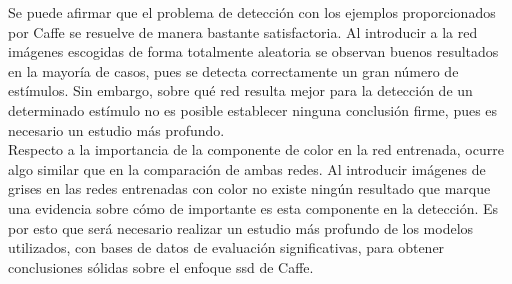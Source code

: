 Se puede afirmar que el problema de detección con los ejemplos proporcionados por Caffe se resuelve de manera bastante satisfactoria. Al introducir a la red imágenes escogidas de forma totalmente aleatoria se observan buenos resultados en la mayoría de casos, pues se detecta correctamente un gran número de estímulos. Sin embargo, sobre qué red resulta mejor para la detección de un determinado estímulo no es posible establecer ninguna conclusión firme, pues es necesario un estudio más profundo.\\

Respecto a la importancia de la componente de color en la red entrenada, ocurre algo similar que en la comparación de ambas redes. Al introducir imágenes de grises en las redes entrenadas con color no existe ningún resultado que marque una evidencia sobre cómo de importante es esta componente en la detección. Es por esto que será necesario realizar un estudio más profundo de los modelos utilizados, con bases de datos de evaluación significativas, para obtener conclusiones sólidas sobre el enfoque \acrshort{ssd} de Caffe.\\

